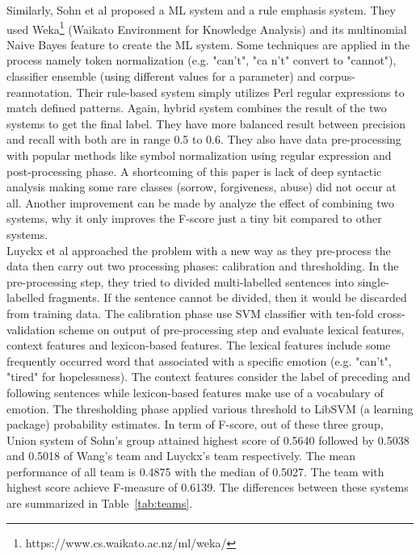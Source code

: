 Similarly, Sohn et al \cite{Sohn2012} proposed a ML system and a rule emphasis system. They used Weka\footnote{https://www.cs.waikato.ac.nz/ml/weka/} (Waikato Environment for Knowledge Analysis) and its multinomial Naive Bayes feature to create the ML system. Some techniques are applied in the process namely token normalization (e.g. "can’t", "ca n’t" convert to "cannot"), classifier ensemble (using different values for a parameter) and corpus-reannotation. Their rule-based system simply utilizes Perl regular expressions to match defined patterns. Again, hybrid system combines the result of the two systems to get the final label. They have more balanced result between precision and recall with both are in range 0.5 to 0.6. They also have data pre-processing with popular methods like symbol normalization using regular expression and post-processing phase. A shortcoming of this paper is lack of deep syntactic analysis making some rare classes (sorrow, forgiveness, abuse) did not occur at all. Another improvement can be made by analyze the effect of combining two systems, why it only improves the F-score just a tiny bit compared to other systems.\\
Luyckx et al \cite{Luyckx2012} approached the problem with a new way as they pre-process the data then carry out two processing phases: calibration and thresholding. In the pre-processing step, they tried to divided multi-labelled sentences into single-labelled fragments. If the sentence cannot be divided, then it would be discarded from training data. The calibration phase use SVM classifier with ten-fold cross-validation scheme on output of pre-processing step and evaluate lexical features, context features and lexicon-based features. The lexical features include some frequently occurred word that associated with a specific emotion (e.g. "can’t", "tired" for hopelessness). The context features consider the label of preceding and following sentences while lexicon-based features make use of a vocabulary of emotion. The thresholding phase applied various threshold to LibSVM (a learning package) probability estimates. In term of F-score, out of these three group, Union system of Sohn's group attained highest score of 0.5640 followed by 0.5038 and 0.5018 of Wang's team and Luyckx's team respectively. The mean performance of all team is 0.4875 with the median of 0.5027. The team with highest score achieve F-measure of 0.6139. The differences between these systems are summarized in Table~\ref{tab:teams}.\\

